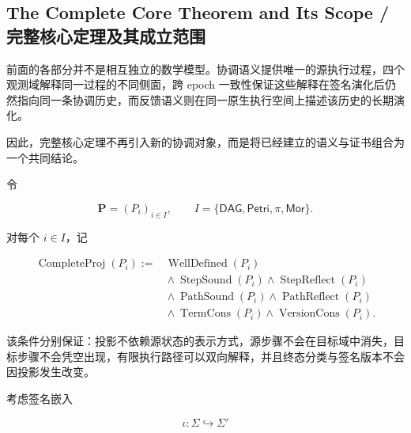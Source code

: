     \subsection{The Complete Core Theorem and Its Scope /
    完整核心定理及其成立范围}
    \label{subsec:complete-core-theorem-and-scope}

    前面的各部分并不是相互独立的数学模型。协调语义提供唯一的源执行过程，四个观测域解释同一过程的不同侧面，跨 epoch 一致性保证这些解释在签名演化后仍然指向同一条协调历史，而反馈语义则在同一原生执行空间上描述该历史的长期演化。

    因此，完整核心定理不再引入新的协调对象，而是将已经建立的语义与证书组合为一个共同结论。

    令

    \begin{equation}
      \boxed{
        \mathbf P
        =
        (P_i)_{i\in I},
        \qquad
        I=
        \{
          \mathsf{DAG},
          \mathsf{Petri},
          \pi,
          \mathsf{Mor}
        \}.
      }
      \label{eq:core-four-projection-family}
    \end{equation}

    对每个 $i\in I$，记

    \begin{equation}
      \boxed{
        \begin{aligned}
          \operatorname{CompleteProj}(P_i)
          :={}&
          \operatorname{WellDefined}(P_i)
          \\
          &{}\land
          \operatorname{StepSound}(P_i)
          \land
          \operatorname{StepReflect}(P_i)
          \\
          &{}\land
          \operatorname{PathSound}(P_i)
          \land
          \operatorname{PathReflect}(P_i)
          \\
          &{}\land
          \operatorname{TermCons}(P_i)
          \land
          \operatorname{VersionCons}(P_i).
        \end{aligned}
      }
      \label{eq:core-complete-projection-certificate}
    \end{equation}

    该条件分别保证：投影不依赖源状态的表示方式，源步骤不会在目标域中消失，目标步骤不会凭空出现，有限执行路径可以双向解释，并且终态分类与签名版本不会因投影发生改变。

    考虑签名嵌入

    \begin{equation}
    \boxed{
      \iota:\Sigma\hookrightarrow\Sigma'}
      \label{eq:core-signature-embedding}
    \end{equation}

